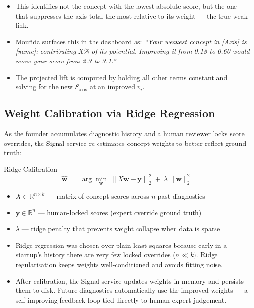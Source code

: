 \documentclass[11pt,a4paper]{article}
\begin{document}
\begin{itemize}
  \item This identifies not the concept with the lowest absolute score, but the one
        that suppresses the axis total the most relative to its weight — the true weak link.
  \item Moufida surfaces this in the dashboard as: \emph{``Your weakest concept in [Axis]
        is [name]: contributing X\% of its potential. Improving it from 0.18 to 0.60
        would move your score from 2.3 to 3.1.''}
  \item The projected lift is computed by holding all other terms constant and solving
        for the new $S_\text{axis}$ at an improved $v_i$.
\end{itemize}

\subsection{Weight Calibration via Ridge Regression}

As the founder accumulates diagnostic history and a human reviewer locks score overrides,
the Signal service re-estimates concept weights to better reflect ground truth:

\begin{mathbox}{Ridge Calibration}
\[
  \hat{\mathbf{w}} \;=\; \arg\min_{\mathbf{w}}\;\left\| X\mathbf{w} - \mathbf{y} \right\|_2^2
  \;+\; \lambda\,\|\mathbf{w}\|_2^2
\]
\begin{itemize}
  \item $X \in \mathbb{R}^{n \times k}$ — matrix of concept scores across $n$ past diagnostics
  \item $\mathbf{y} \in \mathbb{R}^n$ — human-locked scores (expert override ground truth)
  \item $\lambda$ — ridge penalty that prevents weight collapse when data is sparse
\end{itemize}
\end{mathbox}

\begin{itemize}
  \item Ridge regression was chosen over plain least squares because early in a startup's
        history there are very few locked overrides ($n \ll k$). Ridge regularisation keeps
        weights well-conditioned and avoids fitting noise.
  \item After calibration, the Signal service updates weights in memory and persists them
        to disk. Future diagnostics automatically use the improved weights — a self-improving
        feedback loop tied directly to human expert judgement.
\end{itemize}
\end{document}
